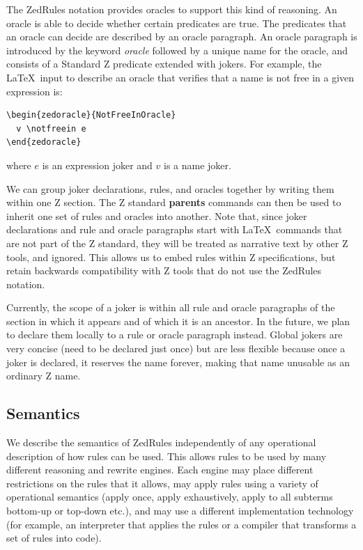 \documentclass{entcs}
\newenvironment{zedoracle}[1]{\par\textbf{oracle }#1\vspace{-2ex}\infrule}{\endinfrule}
\begin{document}
The ZedRules notation provides oracles to support this kind of
reasoning.  An oracle is able to decide whether certain predicates are
true.  The predicates that an oracle can decide are described by an
oracle paragraph.  An oracle paragraph is introduced by the keyword
\emph{oracle} followed by a unique name for the oracle, and consists
of a Standard Z predicate extended with jokers.  For example, the
\LaTeX\ input to describe an oracle that verifies that a name is not
free in a given expression is:
\begin{verbatim}
\begin{zedoracle}{NotFreeInOracle}
  v \notfreein e
\end{zedoracle}
\end{verbatim}
where $e$ is an expression joker and $v$ is a name joker.

We can group joker declarations, rules, and oracles together by
writing them within one Z section.  The Z standard \textbf{parents}
commands can then be used to inherit one set of rules and oracles into
another.  Note that, since joker declarations and rule and oracle
paragraphs start with \LaTeX\ commands that are not part of the Z
standard, they will be treated as narrative text by other Z tools, and
ignored.  This allows us to embed rules within Z specifications, but
retain backwards compatibility with Z tools that do not use the
ZedRules notation.

Currently, the scope of a joker is within all rule and oracle
paragraphs of the section in which it appears and of which it is an
ancestor.  In the future, we plan to declare them locally to a rule or
oracle paragraph instead.  Global jokers are very concise (need to be
declared just once) but are less flexible because once a joker is
declared, it reserves the name forever, making that name unusable as
an ordinary Z name.

\subsection{Semantics}

We describe the semantics of ZedRules independently of any operational
description of how rules can be used.  This allows rules to be used by
many different reasoning and rewrite engines.  Each engine may place
different restrictions on the rules that it allows, may apply rules
using a variety of operational semantics (apply once, apply
exhaustively, apply to all subterms bottom-up or top-down etc.), and
may use a different implementation technology (for example, an
interpreter that applies the rules or a compiler that transforms a set
of rules into code).
\end{document}
